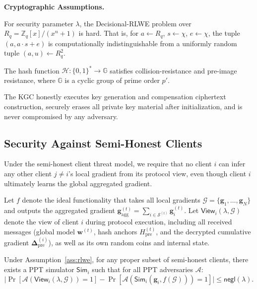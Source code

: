 \noindent\textbf{Cryptographic Assumptions.}
\begin{assumption}
\label{ass:rlwe}
For security parameter $\lambda$, the Decisional-RLWE problem over $R_q = \mathbb{Z}_q[x]/(x^n+1)$ is hard. That is, for $a \gets R_q$, $s \gets \chi$, $e \gets \chi$, the tuple $(a, a \cdot s + e)$ is computationally indistinguishable from a uniformly random tuple $(a, u) \gets R_q^2$.
\end{assumption}

\begin{assumption}
\label{ass:hash}
The hash function $\mathcal{H}: \{0,1\}^* \to \mathbb{G}$ satisfies collision-resistance and pre-image resistance, where $\mathbb{G}$ is a cyclic group of prime order $p'$.
\end{assumption}

\begin{assumption}
\label{ass:kgc}
The KGC honestly executes key generation and compensation ciphertext construction, securely erases all private key material after initialization, and is never compromised by any adversary.
\end{assumption}

\subsection{Security Against Semi-Honest Clients}
\label{ssec:semi-honest}

Under the semi-honest client threat model, we require that no client $i$ can infer any other client $j \neq i$'s local gradient from its protocol view, even though client $i$ ultimately learns the global aggregated gradient.

Let $f$ denote the ideal functionality that takes all local gradients $\mathcal{G} = \{\mathbf{g}_1, \dots, \mathbf{g}_N\}$ and outputs the aggregated gradient $\mathbf{g}_{\text{agg}}^{(t)} = \sum_{i \in \mathcal{S}^{(t)}} \mathbf{g}_i^{(t)}$. Let $\mathsf{View}_i(\lambda, \mathcal{G})$ denote the view of client $i$ during protocol execution, including all received messages (global model $\mathbf{w}^{(t)}$, hash anchors $H_{\text{pre}}^{(t)}$, and the decrypted cumulative gradient $\mathbf{\Delta}_{\text{pre}}^{(i)}$), as well as its own random coins and internal state.

\begin{theorem}
\label{thm:semi-honest}
Under Assumption~\ref{ass:rlwe}, for any proper subset of semi-honest clients, there exists a PPT simulator $\mathsf{Sim}_i$ such that for all PPT adversaries $\mathcal{A}$:
\begin{equation}
    \bigl| \Pr[\mathcal{A}(\mathsf{View}_i(\lambda, \mathcal{G})) = 1] - \Pr[\mathcal{A}(\mathsf{Sim}_i(\mathbf{g}_i, f(\mathcal{G}))) = 1] \bigr| \leq \mathsf{negl}(\lambda).
\end{equation}
\end{theorem}

